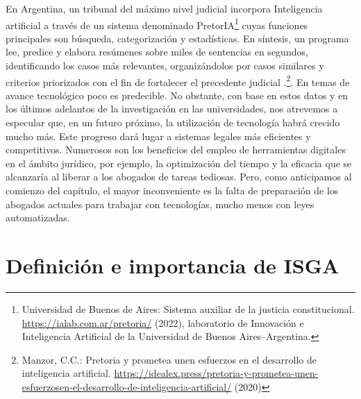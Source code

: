 \documentclass[12pt]{report} %
\begin{document}
En Argentina, un tribunal del máximo nivel judicial incorpora Inteligencia artificial a través de un sistema denominado PretorIA\footnote{Universidad  de Buenos de Aires: Sistema auxiliar de la justicia constitucional. \url{https://ialab.com.ar/pretoria/} (2022), laboratorio de Innovación e Inteligencia Artificial de la Universidad de Buenos Aires–Argentina.}  cuyas funciones principales son búsqueda, categorización y estadísticas. En síntesis, un programa lee, predice y elabora resúmenes sobre miles de sentencias en segundos, identificando los casos más relevantes, organizándolos por casos similares y criterios priorizados con el fin de fortalecer el precedente judicial .\footnote{Manzor, C.C.: Pretoria y prometea unen esfuerzos en el desarrollo de inteligencia artificial. \url{https://idealex.press/pretoria-y-prometea-unen-esfuerzosen-el-desarrollo-de-inteligencia-artificial/} (2020)}. En temas de avance tecnológico poco es predecible. No obstante, con base en estos datos y en los últimos adelantos de la investigación en las universidades, nos atrevemos a especular que, en un futuro próximo, la utilización de tecnología habrá crecido mucho más. Este progreso dará lugar a sistemas legales más eficientes y competitivos. Numerosos son los beneficios del empleo de herramientas digitales en el ámbito jurídico, por ejemplo, la optimización del tiempo y la eficacia que se alcanzaría al liberar a los abogados de tareas tediosas. Pero, como anticipamos al comienzo del capítulo, el mayor inconveniente es la falta de preparación de los abogados actuales para trabajar con tecnologías, mucho menos con leyes automatizadas.

\section{Definición e importancia de ISGA }
\end{document}

